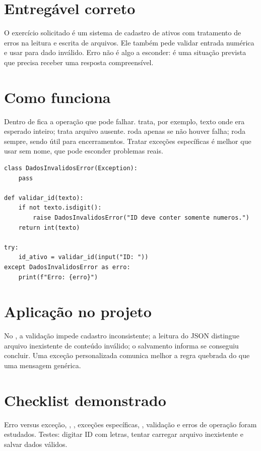 \documentclass[11pt,a4paper]{article}
\begin{document}
\section*{Entregável correto}
O exercício solicitado é um sistema de cadastro de ativos com tratamento de erros na leitura e escrita de arquivos. Ele também pede validar entrada numérica e usar  para dado inválido. Erro não é algo a esconder: é uma situação prevista que precisa receber uma resposta compreensível.
\section*{Como  funciona}
Dentro de  fica a operação que pode falhar.  trata, por exemplo, texto onde era esperado inteiro;  trata arquivo ausente.  roda apenas se não houver falha;  roda sempre, sendo útil para encerramentos. Tratar exceções específicas é melhor que usar  sem nome, que pode esconder problemas reais.
\begin{lstlisting}
class DadosInvalidosError(Exception):
    pass

def validar_id(texto):
    if not texto.isdigit():
        raise DadosInvalidosError("ID deve conter somente numeros.")
    return int(texto)

try:
    id_ativo = validar_id(input("ID: "))
except DadosInvalidosError as erro:
    print(f"Erro: {erro}")
\end{lstlisting}
\section*{Aplicação no projeto}
No , a validação impede cadastro inconsistente; a leitura do JSON distingue arquivo inexistente de conteúdo inválido; o salvamento informa se conseguiu concluir. Uma exceção personalizada comunica melhor a regra quebrada do que uma mensagem genérica.
\section*{Checklist demonstrado}
Erro versus exceção, , , exceções específicas, , validação e erros de operação foram estudados. Testes: digitar ID com letras, tentar carregar arquivo inexistente e salvar dados válidos.
\end{document}
